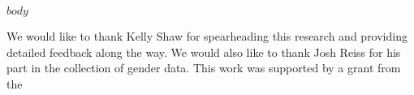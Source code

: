 \documentclass[sigconf, anonymous]{acmart}
\begin{document}
\maketitle

$body$

\balance




\begin{acks}
We would like to thank Kelly Shaw for spearheading this research and providing detailed feedback along the way. We would also like to thank Josh Reiss for his part in the collection of gender data.
  This work was supported by a grant from the 
\end{acks}
\end{document}
